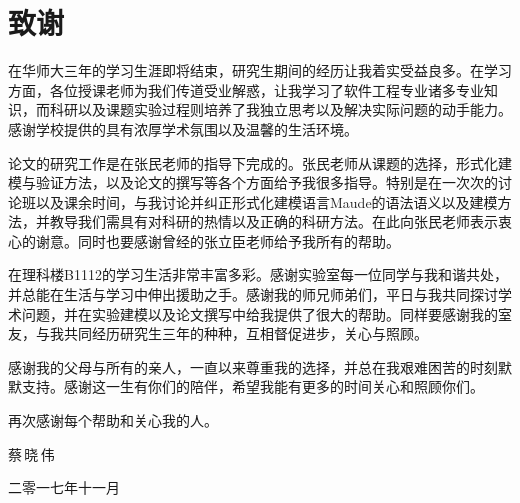 {\kaishu
\chapter*{致\qquad 谢}

在华师大三年的学习生涯即将结束，研究生期间的经历让我着实受益良多。在学习方面，各位授课老师为我们传道受业解惑，让我学习了软件工程专业诸多专业知识，而科研以及课题实验过程则培养了我独立思考以及解决实际问题的动手能力。感谢学校提供的具有浓厚学术氛围以及温馨的生活环境。

论文的研究工作是在张民老师的指导下完成的。张民老师从课题的选择，形式化建模与验证方法，以及论文的撰写等各个方面给予我很多指导。特别是在一次次的讨论班以及课余时间，与我讨论并纠正形式化建模语言Maude的语法语义以及建模方法，并教导我们需具有对科研的热情以及正确的科研方法。在此向张民老师表示衷心的谢意。同时也要感谢曾经的张立臣老师给予我所有的帮助。

在理科楼B1112的学习生活非常丰富多彩。感谢实验室每一位同学与我和谐共处，并总能在生活与学习中伸出援助之手。感谢我的师兄师弟们，平日与我共同探讨学术问题，并在实验建模以及论文撰写中给我提供了很大的帮助。同样要感谢我的室友，与我共同经历研究生三年的种种，互相督促进步，关心与照顾。

感谢我的父母与所有的亲人，一直以来尊重我的选择，并总在我艰难困苦的时刻默默支持。感谢这一生有你们的陪伴，希望我能有更多的时间关心和照顾你们。

再次感谢每个帮助和关心我的人。


\vspace{0.8cm} \hspace{9.8cm} 蔡\,晓\,伟

\hspace{9cm}  二零一七年十一月 }
